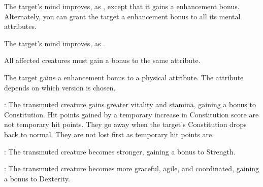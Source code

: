 \begin{spellheader}
    \spellrng{\rngtouch}
    \spelldur{\durshort}
\end{spellheader}
\begin{spelleffects}
    \spelleffect The target's mind improves, as , except that it gains a  enhancement bonus. Alternately, you can grant the target a  enhancement bonus to all its mental attributes.
\end{spelleffects}
\begin{spellfooter}

\end{spellfooter}

\begin{spellheader}
\end{spellheader}
\begin{spelleffects}
    \spelleffect The target's mind improves, as . 
\end{spelleffects}
\begin{spellfooter}
    \spellnotes All affected creatures must gain a bonus to the same attribute.
\end{spellfooter}

\begin{spellheader}
    \spellrng{\rngtouch}
    \spelldur{\durshort}
\end{spellheader}
\begin{spelleffects}
    \spelleffect The target gains a  enhancement bonus to a physical attribute. The attribute depends on which version is chosen.
    \par {}: The transmuted creature gains greater vitality and stamina, gaining a bonus to Constitution. Hit points gained by a temporary increase in Constitution score are not temporary hit points. They go away when the target's Constitution drops back to normal. They are not lost first as temporary hit points are.
    \par {}: The transmuted creature becomes stronger, gaining a bonus to Strength.
    \par {}: The transmuted creature becomes more graceful, agile, and coordinated, gaining a bonus to Dexterity.
\end{spelleffects}
\begin{spellfooter}

\end{spellfooter}


